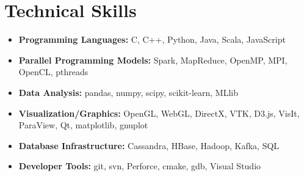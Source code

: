 \section{Technical Skills}

\begin{itemize}

\item \textbf{Programming Languages:} C, C++, Python, Java, Scala, JavaScript

\item \textbf{Parallel Programming Models:} Spark, MapReduce, OpenMP, MPI, OpenCL, pthreads

\item \textbf{Data Analysis:} pandas, numpy, scipy, scikit-learn, MLlib

\item \textbf{Visualization/Graphics:} OpenGL, WebGL, DirectX, VTK, D3.js, VisIt, ParaView, Qt, matplotlib, gnuplot

\item \textbf{Database Infrastructure:} Cassandra, HBase, Hadoop, Kafka, SQL

\item \textbf{Developer Tools:} git, svn, Perforce, cmake, gdb, Visual Studio

\end{itemize}

